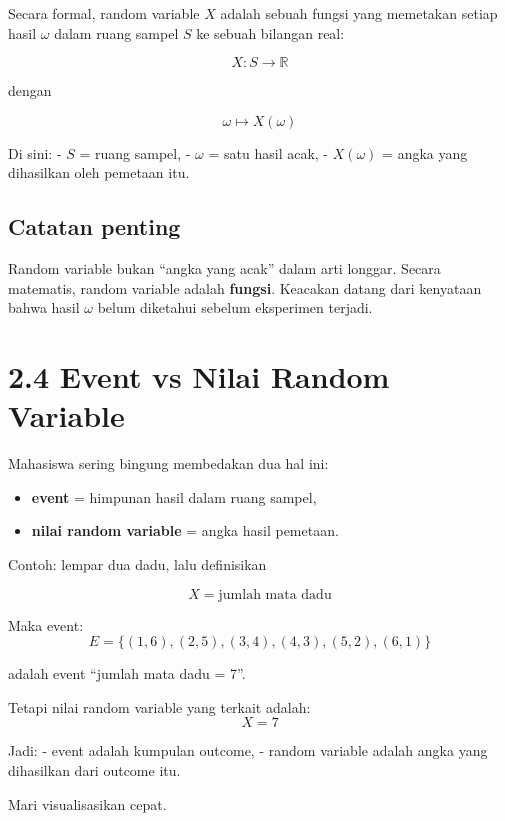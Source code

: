 \documentclass[
  letterpaper,
  DIV=11,
  numbers=noendperiod]{scrreprt}
\providecommand{\tightlist}{%
  \setlength{\itemsep}{0pt}\setlength{\parskip}{0pt}}
\begin{document}
Secara formal, random variable \(X\) adalah sebuah fungsi yang memetakan
setiap hasil \(\omega\) dalam ruang sampel \(S\) ke sebuah bilangan
real:

\[
X: S \to \mathbb{R}
\]

dengan

\[
\omega \mapsto X(\omega)
\]

Di sini: - \(S\) = ruang sampel, - \(\omega\) = satu hasil acak, -
\(X(\omega)\) = angka yang dihasilkan oleh pemetaan itu.

\subsection{Catatan penting}\label{catatan-penting}

Random variable bukan ``angka yang acak'' dalam arti longgar. Secara
matematis, random variable adalah \textbf{fungsi}. Keacakan datang dari
kenyataan bahwa hasil \(\omega\) belum diketahui sebelum eksperimen
terjadi.

\section{2.4 Event vs Nilai Random
Variable}\label{event-vs-nilai-random-variable}

Mahasiswa sering bingung membedakan dua hal ini:

\begin{itemize}
\tightlist
\item
  \textbf{event} = himpunan hasil dalam ruang sampel,
\item
  \textbf{nilai random variable} = angka hasil pemetaan.
\end{itemize}

Contoh: lempar dua dadu, lalu definisikan

\[
X = \text{jumlah mata dadu}
\]

Maka event: \[
E = \{(1,6), (2,5), (3,4), (4,3), (5,2), (6,1)\}
\]

adalah event ``jumlah mata dadu = 7''.

Tetapi nilai random variable yang terkait adalah: \[
X = 7
\]

Jadi: - event adalah kumpulan outcome, - random variable adalah angka
yang dihasilkan dari outcome itu.

Mari visualisasikan cepat.
\end{document}

